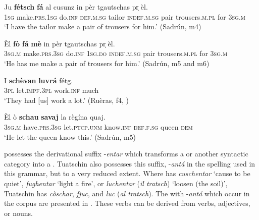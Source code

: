 \ea
\label{ex:causfa4}
\gll Ju \textbf{fétsch} \textbf{fá} al cusunz in pèr tgautschas pr̩ èl.\\
\textsc{1sg} make.\textsc{prs.1sg} do.\textsc{inf} \textsc{def.m.sg} tailor \textsc{indef.m.sg} pair trousers.\textsc{m.pl} for \textsc{3sg.m}\\
\glt `I have the tailor make a pair of trousers for him.' (Sadrún, m4)
\z

\ea
\label{ex:causfa5}
\gll Èl \textbf{fò} \textbf{fá} \textbf{mè} in pèr tgautschas pr̩ èl.\\
\textsc{3sg.m} make.\textsc{prs.3sg} do.\textsc{inf} \textsc{1sg.do} \textsc{indef.m.sg} pair trousers.\textsc{m.pl} for \textsc{3sg.m}\\
\glt `He has me make a pair of trousers for him.' (Sadrún, m5 and m6)
\z

\ea
\label{ex:causscha1}
\gll I \textbf{schèvan} \textbf{luvrá} fétg.\\
\textsc{3pl} let.\textsc{impf.3pl} work.\textsc{inf} much\\
\glt `They had [us] work a lot.' (Ruèras, f4, )
\z

\ea
\label{ex:causscha2}
\gll    Èl ò \textbf{schau} \textbf{savaj} la règína quaj.\\
\textsc{3sg.m} have.\textsc{prs.3sg} let.\textsc{ptcp.unm} know.\textsc{inf} \textsc{def.f.sg} queen \textsc{dem}\\
\glt `He let the queen know this.' (Sadrún, m5)
\z

 possesses the derivational suffix -\textit{entar} which transforms a  or another syntactic category into a . Tuatschin also possesses this suffix, -\textit{antá} in the spelling used in this grammar, but to a very reduced extent. Where  has \textit{cuschentar} `cause to be quiet', \textit{fughentar} `light a fire', or \textit{luchentar} (\textit{il tratsch}) `loosen (the soil)', Tuatschin has \textit{ còschar}, \textit{ fjuc}, and \textit{ luc} (\textit{al tratsch}). The  with -\textit{antá} which occur in the corpus are presented in . These verbs can be derived from verbs, adjectives, or nouns.

